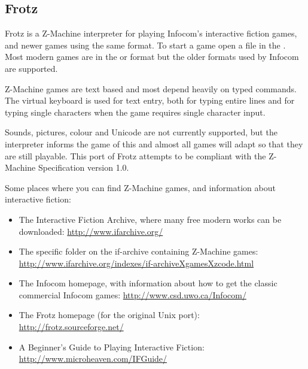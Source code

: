\subsection{Frotz}
Frotz is a Z-Machine interpreter for playing Infocom's interactive fiction
games, and newer games using the same format. To start a game open a
 file in the . Most modern games are
in the  or  format but the older formats used by
Infocom are supported.

Z-Machine games are text based and most depend heavily on typed commands.
The virtual keyboard is used for text entry, both for typing entire lines
and for typing single characters when the game requires single character
input.

Sounds, pictures, colour and Unicode are not currently supported, but
the interpreter informs the game of this and almost all games will
adapt so that they are still playable. This port of Frotz attempts to be
compliant with the Z-Machine Specification version 1.0.

Some places where you can find Z-Machine games, and information about
interactive fiction:
\begin{itemize}
\item The Interactive Fiction Archive, where many free modern works
can be downloaded:
\url{http://www.ifarchive.org/}
\item The specific folder on the if-archive containing Z-Machine games:
\url{http://www.ifarchive.org/indexes/if-archiveXgamesXzcode.html}
\item The Infocom homepage, with information about how to get the
classic commercial Infocom games:
\url{http://www.csd.uwo.ca/Infocom/}
\item The Frotz homepage (for the original Unix port):
\url{http://frotz.sourceforge.net/}
\item A Beginner's Guide to Playing Interactive Fiction:
\url{http://www.microheaven.com/IFGuide/}
\end{itemize}

